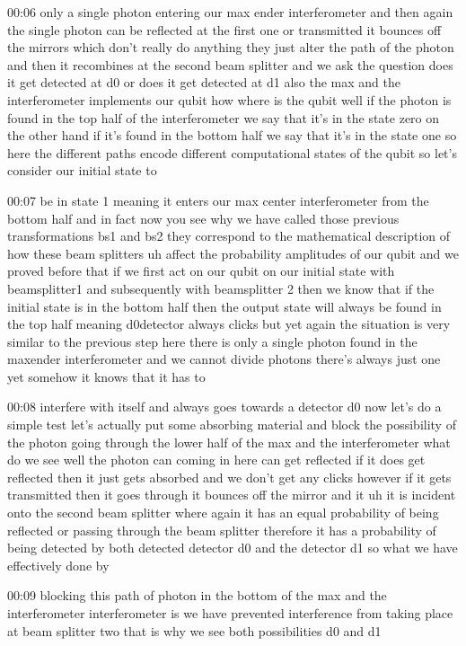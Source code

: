 00:06
only a single photon entering our max ender interferometer
and then again the single photon can be reflected at the first one or
transmitted it bounces off the mirrors which don't
really do anything they just alter the path of the photon
and then it recombines at the second beam splitter and we ask the question
does it get detected at d0 or does it get detected at d1
also the max and the interferometer implements our qubit how where is the qubit
well if the photon is found in the top half
of the interferometer we say that it's in the state zero
on the other hand if it's found in the bottom half we say that it's in the
state one so here the different paths encode different
computational states of the qubit so let's consider our initial state to

00:07
be in state 1 meaning it enters our max center
interferometer from the bottom half and in fact now you see why we have
called those previous transformations bs1 and bs2 they
correspond to the mathematical description of how these beam splitters uh
affect the probability amplitudes of our qubit and we proved before that
if we first act on our qubit on our initial state
with beamsplitter1 and subsequently with beamsplitter 2
then we know that if the initial state is in the bottom half
then the output state will always be found in the top half
meaning d0detector always clicks but yet again the situation is very
similar to the previous step here there is only a single photon found
in the maxender interferometer and we cannot divide
photons there's always just one yet somehow it knows that it has to

00:08
interfere with itself and always goes towards a detector d0
now let's do a simple test let's actually put some absorbing material
and block the possibility of the photon going through the lower half of the max
and the interferometer what do we see well the photon can
coming in here can get reflected if it does get reflected
then it just gets absorbed and we don't get any clicks
however if it gets transmitted then it goes through it bounces off the mirror
and it uh it is incident onto the second beam splitter
where again it has an equal probability of being reflected or passing through
the beam splitter therefore it has a probability of being detected by both
detected detector d0 and the detector d1 so what we have effectively done by

00:09
blocking this path of photon in the bottom of the max and the interferometer
interferometer is we have prevented interference from taking place
at beam splitter two that is why we see both possibilities d0 and d1


